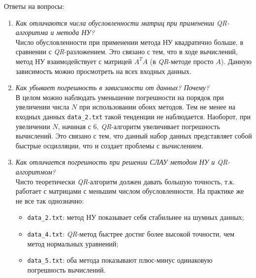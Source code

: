 \documentclass{article}
\begin{document}
Ответы на вопросы:
\begin{enumerate}
    \item \textit{Как отличаются числа обусловленности матриц при применении QR-алгоритма и метода НУ?} \\
    Число обусловленности при применении метода НУ квадратично больше, в сравнении с \textit{QR}-разложением. Это связано с тем, что в ходе вычислений, метод НУ взаимодействует с матрицей $A^TA$ (в \textit{QR}-методе просто $A$). Данную зависимость можно просмотреть на всех входных данных.
    \item \textit{Как убывает погрешность в зависимости от данных? Почему?} \\
    В целом можно наблюдать уменьшение погрешности на порядок при увеличении числа $N$ при использовании обоих методов. Тем не менее на входных данных \texttt{data\_2.txt} такой тенденции не наблюдается. Наоборот, при увеличении $N$, начиная с 6, \textit{QR}-алгоритм увеличивает погрешность вычислений. Это связано с тем, что данный набор данных представляет собой быстрые осцилляции, что и создает проблемы с вычислением.
    \item \textit{Как отличается погрешность при решении СЛАУ методом НУ и QR-алгоритмом?} \\
    Чисто теоретически \textit{QR}-алгоритм должен давать большую точность, т.к. работает с матрицами с меньшим числом обусловленности. На практике же не все так однозначно:
    \begin{itemize}
        \item \texttt{data\_2.txt}: метод НУ показывает себя стабильнее на шумных данных;
        \item \texttt{data\_4.txt}: \textit{QR}-метод быстрее достиг более высокой точности, чем метод нормальных уравнений;
        \item \texttt{data\_5.txt}: оба метода показывают плюс-минус одинаковую погрешность вычислений.
    \end{itemize}
\end{enumerate}
\end{document}
